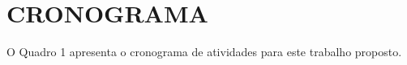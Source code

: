 
\chapter{CRONOGRAMA}
\label{sec:cronograma}

O Quadro 1 apresenta o cronograma de atividades para este trabalho proposto.

